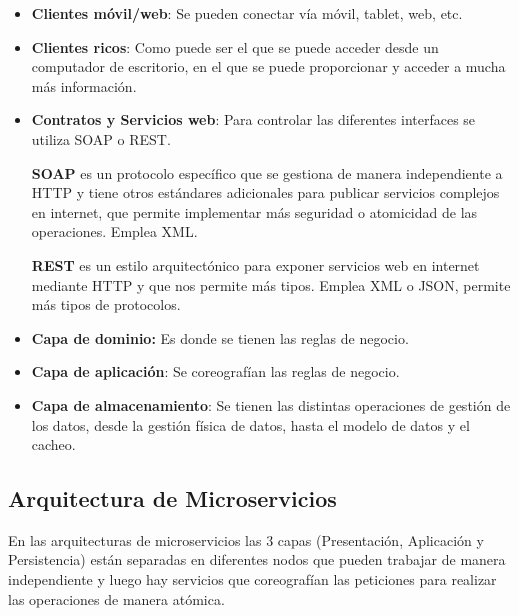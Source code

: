 \documentclass[12pt, twoside, openright]{report} %
\begin{document}
\begin{itemize}
	\item \textbf{Clientes móvil/web}: Se pueden conectar vía móvil, tablet, web, etc.
	\item \textbf{Clientes ricos}: Como puede ser el que se puede acceder desde un computador de escritorio, en el que se puede proporcionar y acceder a mucha más información.
	\item \textbf{Contratos y Servicios web}: Para controlar las diferentes interfaces se utiliza SOAP o REST.

	      \textbf{SOAP} es un protocolo específico que se gestiona de manera independiente a HTTP y tiene otros estándares adicionales para publicar servicios complejos en internet, que permite implementar más seguridad o atomicidad de las operaciones. Emplea XML.

	      \textbf{REST} es un estilo arquitectónico para exponer servicios web en internet mediante HTTP y que nos permite más tipos. Emplea XML o JSON, permite más tipos de protocolos.

	\item \textbf{Capa de dominio:} Es donde se tienen las reglas de negocio.
	\item \textbf{Capa de aplicación}: Se coreografían las reglas de negocio.
	\item \textbf{Capa de almacenamiento}: Se tienen las distintas operaciones de gestión de los datos, desde la gestión física de datos, hasta el modelo de datos y el cacheo.
\end{itemize}

\pagebreak
\subsection{Arquitectura de Microservicios}
En las arquitecturas de microservicios las 3 capas (Presentación, Aplicación y Persistencia) están separadas en diferentes nodos que pueden trabajar de manera independiente y luego hay servicios que coreografían las peticiones para realizar las operaciones de manera atómica.
\end{document}
